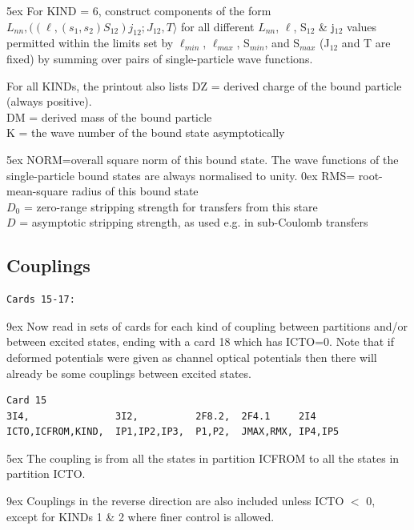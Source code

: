 \documentclass[11pt]{article}
\begin{document}
\hangindent 5ex
For KIND = 6, construct components of the form
$
              L_{nn}, ((\ell, (s_1,s_2)S_{12})j_{12}; J_{12},T\rangle
$
for all different $L_{nn}$, $\ell$, S$_{12}$ \& j$_{12}$ values permitted within the
limits set by $\ell_{min}$, $\ell_{max}$, S$_{min}$, and S$_{max}$
(J$_{12}$ and T are fixed)
by summing over pairs of single-particle wave functions.
\bigskip

For all KINDs, the printout also lists
\bigskip
DZ = derived charge of the bound particle (always positive).
\\
DM = derived mass of the bound particle
\\
K  = the wave number of the bound state asymptotically

\hangindent 5ex
NORM=overall square norm of this bound state.
The wave functions of the single-particle bound states are always
normalised to unity.
%
\hangindent 0ex
RMS= root-mean-square radius of this bound state
\\
$D_{0}$ = zero-range stripping strength for transfers from this stare
\\
$D$  = asymptotic stripping strength, as used e.g. in sub-Coulomb
transfers

\newpage
\subsection{Couplings}
%

\begin{verbatim}
Cards 15-17:
\end{verbatim}

\hangindent 9ex
Now read in sets of cards for each kind of coupling between partitions
and/or between excited states, ending with a card 18 which has ICTO=0.
Note that if deformed potentials were given as channel optical
potentials then there will already be some couplings between
excited states.

\begin{verbatim}
Card 15
3I4,               3I2,          2F8.2,  2F4.1     2I4
ICTO,ICFROM,KIND,  IP1,IP2,IP3,  P1,P2,  JMAX,RMX, IP4,IP5
\end{verbatim}

\hangindent 5ex
The coupling is from all the states in partition ICFROM
to all the states in partition ICTO.

\hangindent 9ex
Couplings in the reverse direction are also included unless
ICTO $<$ 0, except for KINDs 1 \& 2 where finer control is allowed.
\end{document}
